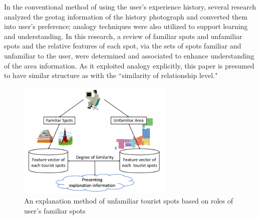 \documentclass[journal]{IAENGtran}
\begin{document}
In the conventional method of using the user's experience history, several research analyzed the geotag information of the history photograph and converted them into user's preference; analogy techniques were also utilized to support learning and understanding.
In this research, a review of familiar spots and unfamiliar spots and the relative features of each spot, via the sets of spots familiar and unfamiliar to the user, were determined and associated to enhance understanding of the area information.
As it exploited analogy explicitly, this paper is presumed to have similar structure as with the ``similarity of relationship level."

\begin{figure}[t]
  \begin{center}
    \includegraphics[clip,width=7.5cm,bb=0 0 720 540]{picture/Photo_Image_eng.png}
    \caption{An explanation method of unfamiliar tourist spots based on roles of user's familiar spots}
    \label{fig:Photo_Image}
   \end{center}
\end{figure}

\end{document}
